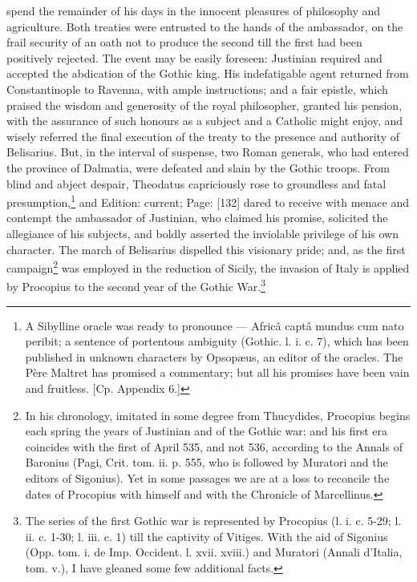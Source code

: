 spend the remainder of his days in the innocent pleasures of philosophy and agriculture. Both treaties were entrusted to the hands of the ambassador, on the frail security of an oath not to produce the second till the first had been positively rejected. The event may be easily foreseen: Justinian required and accepted the abdication of the Gothic king. His indefatigable agent returned from Constantinople to Ravenna, with ample instructions; and a fair epistle, which praised the wisdom and generosity of the royal philosopher, granted his pension, with the assurance of such honours as a subject and a Catholic might enjoy, and wisely referred the final execution of the treaty to the presence and authority of Belisarius. But, in the interval of suspense, two Roman generals, who had entered the province of Dalmatia, were defeated and slain by the Gothic troops. From blind and abject despair, Theodatus capriciously rose to groundless and fatal presumption,\footnote{A Sibylline oracle was ready to pronounce \texthebrew{—} Africâ captâ mundus cum nato peribit; a sentence of portentous ambiguity (Gothic. l. i. c. 7), which has been published in unknown characters by Opsopæus, an editor of the oracles. The Père Maltret has promised a commentary; but all his promises have been vain and fruitless. [Cp. Appendix 6.]} and Edition: current; Page: [132] dared to receive with menace and contempt the ambassador of Justinian, who claimed his promise, solicited the allegiance of his subjects, and boldly asserted the inviolable privilege of his own character. The march of Belisarius dispelled this visionary pride; and, as the first campaign\footnote{In his chronology, imitated in some degree from Thucydides, Procopius begins each spring the years of Justinian and of the Gothic war; and his first era coincides with the first of April 535, and not 536, according to the Annals of Baronius (Pagi, Crit. tom. ii. p. 555, who is followed by Muratori and the editors of Sigonius). Yet in some passages we are at a loss to reconcile the dates of Procopius with himself and with the Chronicle of Marcellinus.} was employed in the reduction of Sicily, the invasion of Italy is applied by Procopius to the second year of the Gothic War.\footnote{The series of the first Gothic war is represented by Procopius (l. i. c. 5-29; l. ii. c. 1-30; l. iii. c. 1) till the captivity of Vitiges. With the aid of Sigonius (Opp. tom. i. de Imp. Occident. l. xvii. xviii.) and Muratori (Annali d\texthebrew{}’Italia, tom. v.), I have gleaned some few additional facts.}

